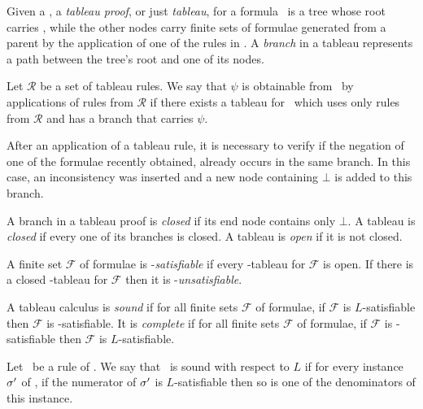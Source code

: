 Given a , a \emph{tableau proof}, or just \emph{tableau}, for a
formula \formula~is a tree whose root carries \formula, while the other nodes
carry finite sets of formulae generated from a parent by the
application of one of the rules in . A \emph{branch} in a tableau
represents a path between the tree's root and one of its nodes.

\begin{definition}
    Let $\mathcal{R}$ be a set of tableau rules. We say that $\psi$ is obtainable
    from \formula~by applications of rules from $\mathcal{R}$ if there exists a
    tableau for \formula~which uses only rules from $\mathcal{R}$ and has a
    branch that carries $\psi$.
\end{definition}

After an application of a tableau rule, it is necessary to verify if the
negation of one of the formulae recently obtained, already occurs in the
same branch. In this case, an inconsistency was inserted and a new node
containing $\bot$ is added to this branch.

\begin{definition}
    A branch in a tableau proof is \emph{closed} if its end node
    contains only $\bot$. A tableau is \emph{closed} if every one of its
    branches is closed. A tableau is \emph{open} if it is not closed.
\end{definition}

\begin{definition}
    A finite set $\mathcal{F}$ of formulae is -\emph{satisfiable} if
    every -tableau for $\mathcal{F}$ is open. If there is a closed
    -tableau for $\mathcal{F}$ then it is
    -\emph{unsatisfiable}. 
\end{definition}

\begin{definition}
    A tableau calculus  is \emph{sound} if for all finite sets
    $\mathcal{F}$ of formulae, if $\mathcal{F}$ is $L$-satisfiable then
    $\mathcal{F}$ is -satisfiable. It is \emph{complete} if for all
    finite sets $\mathcal{F}$ of formulae, if $\mathcal{F}$ is
    -satisfiable then $\mathcal{F}$ is $L$-satisfiable.
\end{definition}

\begin{definition}
\label{rulecorrectness}
    Let \trule~be a rule of . We say that \trule~is sound with respect
    to $L$ if for every instance $\sigma'$ of \trule, if the numerator of $\sigma'$
    is $L$-satisfiable then so is one of the denominators of this instance.
\end{definition}

